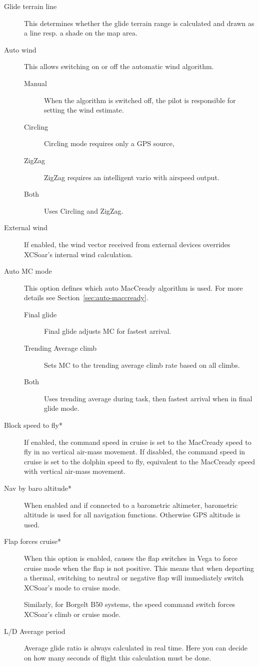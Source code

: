 \documentclass[a4paper,12pt]{refrep}
\begin{document}
\begin{description}
\item[Glide terrain line]  \label{conf:gliderange} This determines whether the
glide terrain range is calculated and drawn as a line resp. a shade on the map area.
\item[Auto wind]  \label{conf:autowind} This allows switching on or off the
automatic wind algorithm.
 \begin{description}
\item[Manual]  When the algorithm is switched off, the pilot is responsible for
  setting the wind estimate.
\item[Circling]  Circling mode requires only a GPS source, 
\item[ZigZag]  ZigZag requires an intelligent vario with airspeed output.
\item[Both]  Uses Circling and ZigZag.
\end{description}

\item[External wind]  If enabled, the wind vector received from external
devices overrides XCSoar's internal wind calculation.

\item[Auto MC mode] This option defines which auto MacCready algorithm is used.
For more details see Section~\ref{sec:auto-maccready}.
 \begin{description}
\item[Final glide] Final glide adjusts MC for fastest arrival.
\item[Trending Average climb]  Sets MC to the trending average climb rate
based on all climbs.
\item[Both] Uses trending average during task, then fastest arrival when in
final glide mode.
\end{description}

\item[Block speed to fly*] If enabled, the command speed in cruise
  is set to the MacCready speed to fly in no vertical air-mass movement.
  If disabled, the command speed in cruise is set to the dolphin speed to fly,
  equivalent to the MacCready speed with vertical air-mass movement.

\item[Nav by baro altitude*] When enabled and if connected to a barometric
  altimeter, barometric altitude is used for all navigation functions. Otherwise
  GPS altitude is used.

\item[Flap forces cruise*]
  When this option is enabled, causes the flap switches in Vega to
  force cruise mode when the flap is not positive.  This means that
  when departing a thermal, switching to neutral or negative flap will
  immediately switch XCSoar's mode to cruise mode.

  Similarly, for Borgelt B50 systems, the speed command switch forces
  XCSoar's climb or cruise mode.

\item[L/D Average period] Average glide ratio is always calculated in real time. Here you can decide 
on how many seconds of flight this calculation must be done.
\end{description}
\end{document}
